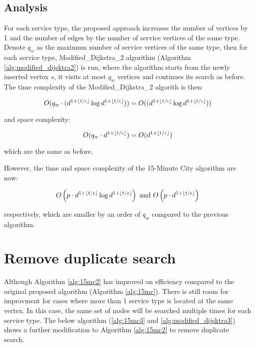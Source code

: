 \subsection{Analysis}

For each service type, the proposed approach increases the number of vertices by 1 and the number of edges by the number of service vertices of the same type. Denote $q_w$ as the maximum number of service vertices of the same type, then for each service type, Modified\_Dijkstra\_2 algorithm (Algorithm \ref{alg:modified_dijsktra2}) is run, where the algorithm starts from the newly inserted vertex $s$, it visits at most $q_w$ vertices and continues its search as before. The time complexity of the Modified\_Dijkstra\_2 algorith is then:

$$O(q_w\cdot(d^{1+\floor*{t/\epsilon}}\log d^{1+\floor*{t/\epsilon}}))=O((d^{1+\floor*{t/\epsilon}}\log d^{1+\floor*{t/\epsilon}}))$$

and space complexity:

$$O(q_w\cdot d^{1+\floor*{t/\epsilon}})=O(d^{1+\floor*{t/\epsilon}})$$

which are the same as before.

However, the time and space complexity of the 15-Minute City algorithm are now:

$$O\left(p\cdot d^{1+\floor*{t/\epsilon}}\log d^{1+\floor*{t/\epsilon}}\right)\text{ and }O\left(p\cdot d^{1+\floor*{t/\epsilon}}\right)$$

respectively, which are smaller by an order of $q_w$ compared to the previous algorithm.

\section{Remove duplicate search}

Although Algorithm \ref{alg:15mc2} has improved on efficiency compared to the original proposed algorithm (Algorithm \ref{alg:15mc}). There is still room for improvment for cases where more than 1 service type is located at the same vertex. In this case, the same set of nodes will be searched multiple times for each service type. The below algorithm (\ref{alg:15mc3} and \ref{alg:modified_dijsktra3}) shows a further modification to Algorithm \ref{alg:15mc2} to remove duplicate search. 

